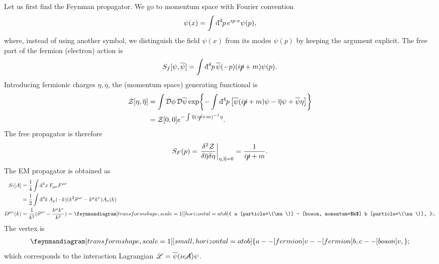 Let us first find the Feynman propagator.
We go to momentum space with Fourier convention
\begin{equation}
  \psi(x) = \int \bdd[4]{p} e^{i p \cdot x} \psi(p),
\end{equation}
where, instead of using another symbol, we distinguish the field $\psi(x)$ from its modes $\psi(p)$ by keeping the argument explicit.
The free part of the fermion (electron) action is
\begin{equation}
  S_f[\psi, \overline{\psi}{}] = \int \bdd[4]{p} \overline{\psi} (-p) (i \cancel{p} + m) \psi(p).
\end{equation}
Introducing fermionic charges $\eta, \overline{\eta}{}$, the (momentum space) generating functional is
\begin{align}
  \mathcal{Z} [\eta, \overline{\eta}{}] &= \int \pdd{\phi} \pdd{\overline{\psi}{}} \exp{ - \int \bdd[4]{p} \left[ \overline{\psi}{}(i \cancel{p} + m) \psi - \overline{\eta}{} \psi + \overline{\psi}{} \eta \right] } \\
					&= \mathcal{Z}[0, 0] e^{-\int \overline{\eta}{}(i \cancel{p} + m)^{-1} \eta}.
\end{align}
The free propagator is therefore 
\begin{equation}
  S_F(p) = \left.\frac{\delta^2 \mathcal{Z}}{\delta \overline{\eta}{} \delta \eta}\right\rvert_{\eta, \overline{\eta}{} = 0} = \frac{1}{i \cancel{p} + m}.
\end{equation}
The EM propagator is obtained as
\begin{align}
  S_? [A] &= \frac{1}{4} \int \dd[4]{x} F_{\mu\nu} F^{\mu\nu} \\
	  &= \frac{1}{2} \int \bdd[4]{k} A_{\mu}(-k) (k^2 \delta^{\mu\nu} - k^{\mu} k^{\nu}) A_{\nu}(k) \\
  D^{\mu\nu}(k) &= \frac{1}{k^2} (\delta^{\mu\nu} - \frac{k^{\mu} k^{\nu}}{k^2}) = 
  \begin{gathered}
    \feynmandiagram[transform shape, scale=1][horizontal=a to b] {
      a [particle=\(\mu\)] -- [boson, momentum=$k$] b [particle=\(\nu\)],
    };
  \end{gathered}.
\end{align}
The vertex is
\begin{equation}
  \begin{gathered}
    \feynmandiagram[transform shape, scale=1][small, horizontal=a to b] {
      a -- [fermion] v -- [fermion] b,
      c -- [boson] v, 
    };
  \end{gathered}
\end{equation}
which corresponds to the interaction Lagrangian $\mathscr{L} = \overline{\psi}{} (ie \cancel{A}) \psi$.
